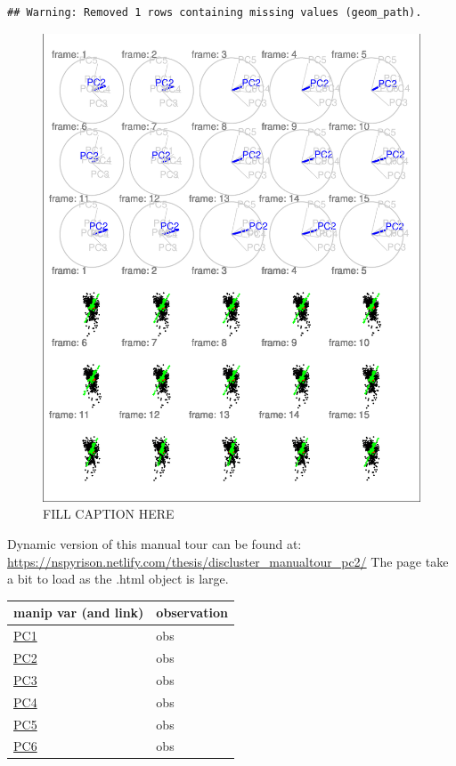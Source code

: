 \documentclass{monashthesis}
\begin{document}
\begin{verbatim}
## Warning: Removed 1 rows containing missing values (geom_path).
\end{verbatim}

\begin{figure}
\centering
\includegraphics{thesis_files/figure-latex/DISclusterBad-1.pdf}
\caption{\label{fig:DISclusterBad}FILL CAPTION HERE}
\end{figure}

Dynamic version of this manual tour can be found at:
\url{https://nspyrison.netlify.com/thesis/discluster_manualtour_pc2/}
The page take a bit to load as the .html object is large.

\begin{longtable}[]{@{}ll@{}}
\toprule
manip var (and link) & observation\tabularnewline
\midrule
\endhead
\href{https://nspyrison.netlify.com/thesis/discluster_manualtour_pc1/}{PC1}
& obs\tabularnewline
\href{https://nspyrison.netlify.com/thesis/discluster_manualtour_pc2/}{PC2}
& obs\tabularnewline
\href{https://nspyrison.netlify.com/thesis/discluster_manualtour_pc3/}{PC3}
& obs\tabularnewline
\href{https://nspyrison.netlify.com/thesis/discluster_manualtour_pc4/}{PC4}
& obs\tabularnewline
\href{https://nspyrison.netlify.com/thesis/discluster_manualtour_pc5/}{PC5}
& obs\tabularnewline
\href{https://nspyrison.netlify.com/thesis/discluster_manualtour_pc6/}{PC6}
& obs\tabularnewline
\bottomrule
\end{longtable}
\end{document}
